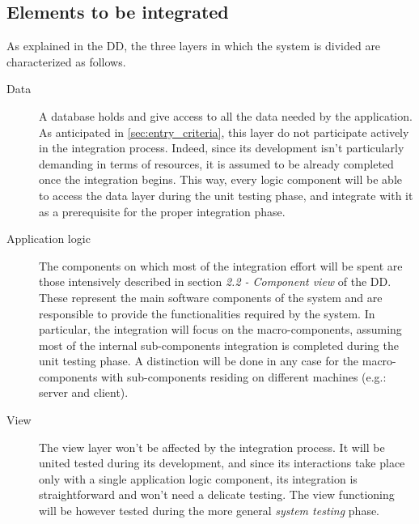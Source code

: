 \subsection{Elements to be integrated}
	As explained in the DD, the three layers in which the system is divided are characterized as follows.
	\begin{description}
		\item[Data] A database holds and give access to all the data needed by the application. As anticipated in \autoref{sec:entry_criteria}, this layer do not participate actively in the integration process. Indeed, since its development isn't particularly demanding in terms of resources, it is assumed to be already completed once the integration begins. This way, every logic component will be able to access the data layer during the unit testing phase, and integrate with it as a prerequisite for the proper integration phase.
		\item[Application logic] The components on which most of the integration effort will be spent are those intensively described in section \textit{2.2 - Component view} of the DD. These represent the main software components of the system and are responsible to provide the functionalities required by the system. In particular, the integration will focus on the macro-components, assuming most of the internal sub-components integration is completed during the unit testing phase. A distinction will be done in any case for the macro-components with sub-components residing on different machines (e.g.: server and client). %
		\item[View] The view layer won't be affected by the integration process. It will be united tested during its development, and since its interactions take place only with a single application logic component, its integration is straightforward and won't need a delicate testing. The view functioning will be however tested during the more general \textit{system testing} phase. %
	\end{description}

